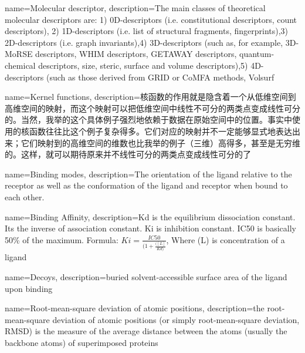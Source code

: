 



{
    name=Molecular descriptor,
    description={The main classes of theoretical molecular descriptors are: 1) 0D-descriptors (i.e. constitutional descriptors, count descriptors), 2) 1D-descriptors (i.e. list of structural fragments, fingerprints),3) 2D-descriptors (i.e. graph invariants),4) 3D-descriptors (such as, for example, 3D-MoRSE descriptors, WHIM descriptors, GETAWAY descriptors, quantum-chemical descriptors, size, steric, surface and volume descriptors),5) 4D-descriptors (such as those derived from GRID or CoMFA methods, Volsurf}
}



{
    name=Kernel functions,
    description={核函数的作用就是隐含着一个从低维空间到高维空间的映射，而这个映射可以把低维空间中线性不可分的两类点变成线性可分的。当然，我举的这个具体例子强烈地依赖于数据在原始空间中的位置。事实中使用的核函数往往比这个例子复杂得多。它们对应的映射并不一定能够显式地表达出来；它们映射到的高维空间的维数也比我举的例子（三维）高得多，甚至是无穷维的。这样，就可以期待原来并不线性可分的两类点变成线性可分的了 }
}

{
    name=Binding modes,
    description={The orientation of the ligand relative to the receptor as well as the conformation of the ligand and receptor when bound to each other.}
}


{
    name=Binding Affinity,
    description={Kd is the equilibrium dissociation constant. Its the inverse of association constant.
    Ki is inhibition constant.
    IC50 is basically 50\% of the maximum.
    Formula:
    $Ki=\frac{IC50}{(1+\frac{([L]}{Kd)}}$, Where (L) is concentration of a ligand}
}



{
    name=Decoys,
    description={buried solvent-accessible surface area of the ligand upon binding}
}




{
    name=Root-mean-square deviation of atomic positions,
    description={the root-mean-square deviation of atomic positions (or simply root-mean-square deviation, RMSD) is the measure of the average distance between the atoms (usually the backbone atoms) of superimposed proteins}
}


